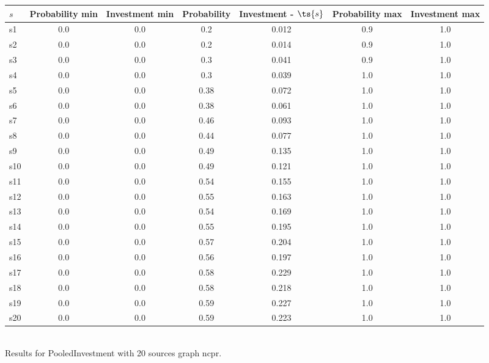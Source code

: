 \documentclass{article}
\begin{document}
\noindent\begin{tabular}{|l|c|c|c|c|c|c|}
\hline
$s$& Probability min & Investment min & Probability & Investment - $\ts{s}$ & Probability max & Investment max\\
\hline
s1 &0.0 & 0.0 & 0.2 & 0.012 & 0.9 & 1.0\\
\hline
s2 &0.0 & 0.0 & 0.2 & 0.014 & 0.9 & 1.0\\
\hline
s3 &0.0 & 0.0 & 0.3 & 0.041 & 0.9 & 1.0\\
\hline
s4 &0.0 & 0.0 & 0.3 & 0.039 & 1.0 & 1.0\\
\hline
s5 &0.0 & 0.0 & 0.38 & 0.072 & 1.0 & 1.0\\
\hline
s6 &0.0 & 0.0 & 0.38 & 0.061 & 1.0 & 1.0\\
\hline
s7 &0.0 & 0.0 & 0.46 & 0.093 & 1.0 & 1.0\\
\hline
s8 &0.0 & 0.0 & 0.44 & 0.077 & 1.0 & 1.0\\
\hline
s9 &0.0 & 0.0 & 0.49 & 0.135 & 1.0 & 1.0\\
\hline
s10 &0.0 & 0.0 & 0.49 & 0.121 & 1.0 & 1.0\\
\hline
s11 &0.0 & 0.0 & 0.54 & 0.155 & 1.0 & 1.0\\
\hline
s12 &0.0 & 0.0 & 0.55 & 0.163 & 1.0 & 1.0\\
\hline
s13 &0.0 & 0.0 & 0.54 & 0.169 & 1.0 & 1.0\\
\hline
s14 &0.0 & 0.0 & 0.55 & 0.195 & 1.0 & 1.0\\
\hline
s15 &0.0 & 0.0 & 0.57 & 0.204 & 1.0 & 1.0\\
\hline
s16 &0.0 & 0.0 & 0.56 & 0.197 & 1.0 & 1.0\\
\hline
s17 &0.0 & 0.0 & 0.58 & 0.229 & 1.0 & 1.0\\
\hline
s18 &0.0 & 0.0 & 0.58 & 0.218 & 1.0 & 1.0\\
\hline
s19 &0.0 & 0.0 & 0.59 & 0.227 & 1.0 & 1.0\\
\hline
s20 &0.0 & 0.0 & 0.59 & 0.223 & 1.0 & 1.0\\
\hline
\end{tabular}\\

\noindent Results for PooledInvestment with 20 sources graph ncpr.
\end{document}
